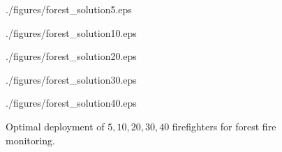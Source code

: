 \begin{figure}[ht!]
    \vspace*{-2mm}
	\begin{center}
		\begin{overpic}[width={\ifoc 4in \else 2.4in \fi},tics=5]{./figures/forest_solution5.eps}
		\end{overpic}
    \end{center}
	\begin{center}
		\begin{overpic}[width={\ifoc 4in \else 2.4in \fi},tics=5]{./figures/forest_solution10.eps}
		\end{overpic}
    \end{center}
	\begin{center}
		\begin{overpic}[width={\ifoc 4in \else 2.4in \fi},tics=5]{./figures/forest_solution20.eps}
		\end{overpic}
    \end{center}
	\begin{center}
		\begin{overpic}[width={\ifoc 4in \else 2.4in \fi},tics=5]{./figures/forest_solution30.eps}
		\end{overpic}
    \end{center}
	\begin{center}
		\begin{overpic}[width={\ifoc 4in \else 2.4in \fi},tics=5]{./figures/forest_solution40.eps}
		\end{overpic}
	\end{center}
	\vspace*{-2mm}
	\caption{\label{fig:opg-more-forest}  Optimal deployment of $5, 10, 20, 30, 40$ firefighters for 
	forest fire monitoring.}
	\vspace*{-3mm}
\end{figure}

